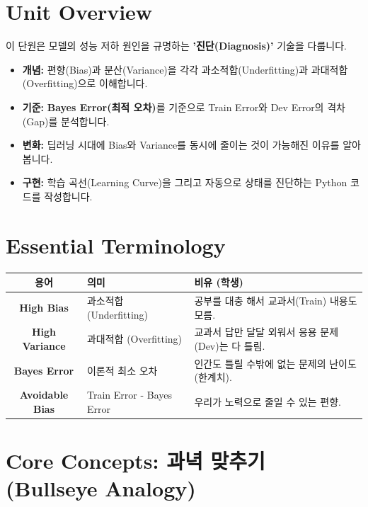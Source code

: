 \documentclass[11pt,a4paper]{book}
\theoremstyle{definition}
\begin{document}
\section{Unit Overview}
\begin{summarybox}[title={핵심 목표}]
이 단원은 모델의 성능 저하 원인을 규명하는 \textbf{'진단(Diagnosis)'} 기술을 다룹니다.
\begin{itemize}
    \item \textbf{개념:} 편향(Bias)과 분산(Variance)을 각각 과소적합(Underfitting)과 과대적합(Overfitting)으로 이해합니다.
    \item \textbf{기준:} \textbf{Bayes Error(최적 오차)}를 기준으로 Train Error와 Dev Error의 격차(Gap)를 분석합니다.
    \item \textbf{변화:} 딥러닝 시대에 Bias와 Variance를 동시에 줄이는 것이 가능해진 이유를 알아봅니다.
    \item \textbf{구현:} 학습 곡선(Learning Curve)을 그리고 자동으로 상태를 진단하는 Python 코드를 작성합니다.
\end{itemize}
\end{summarybox}

\section{Essential Terminology}
\begin{center}
\begin{tabular}{|c|l|l|}
\hline
\textbf{용어} & \textbf{의미} & \textbf{비유 (학생)} \\ \hline
\textbf{High Bias} & 과소적합 (Underfitting) & 공부를 대충 해서 교과서(Train) 내용도 모름. \\ \hline
\textbf{High Variance} & 과대적합 (Overfitting) & 교과서 답만 달달 외워서 응용 문제(Dev)는 다 틀림. \\ \hline
\textbf{Bayes Error} & 이론적 최소 오차 & 인간도 틀릴 수밖에 없는 문제의 난이도 (한계치). \\ \hline
\textbf{Avoidable Bias} & Train Error - Bayes Error & 우리가 노력으로 줄일 수 있는 편향. \\ \hline
\end{tabular}
\end{center}

\section{Core Concepts: 과녁 맞추기 (Bullseye Analogy)}
\end{document}
